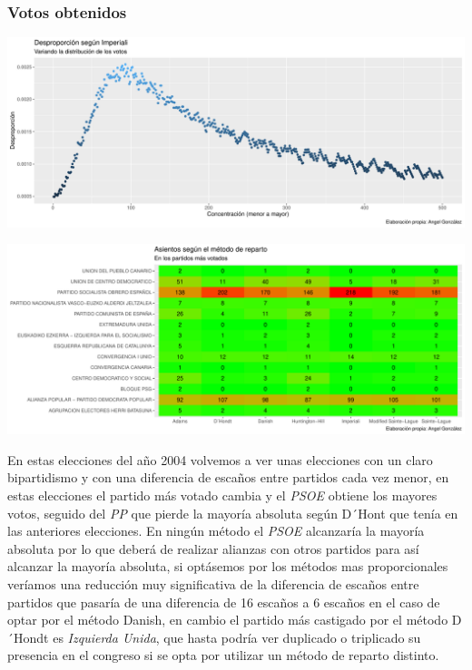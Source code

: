 \documentclass[12pt,a4paper,]{book}
\numberwithin{dummy}{section}
\theoremstyle{ocrenumbox}
\theoremstyle{blacknumex}
\theoremstyle{blacknumbox}
\theoremstyle{ocrenum}
\theoremstyle{ocrenum}
\begin{document}
\hypertarget{votos-obtenidos-8}{%
\subsubsection{Votos obtenidos}\label{votos-obtenidos-8}}

\begin{center}\includegraphics[width=1\linewidth]{figurasR/unnamed-chunk-29-1} \end{center}

\begin{center}\includegraphics[width=1\linewidth]{figurasR/unnamed-chunk-29-2} \end{center}

En estas elecciones del año 2004 volvemos a ver unas elecciones con un
claro bipartidismo y con una diferencia de escaños entre partidos cada
vez menor, en estas elecciones el partido más votado cambia y el
\emph{PSOE} obtiene los mayores votos, seguido del \emph{PP} que pierde
la mayoría absoluta según D´Hont que tenía en las anteriores elecciones.
En ningún método el \emph{PSOE} alcanzaría la mayoría absoluta por lo
que deberá de realizar alianzas con otros partidos para así alcanzar la
mayoría absoluta, si optásemos por los métodos mas proporcionales
veríamos una reducción muy significativa de la diferencia de escaños
entre partidos que pasaría de una diferencia de 16 escaños a 6 escaños
en el caso de optar por el método Danish, en cambio el partido más
castigado por el método D´Hondt es \emph{Izquierda Unida}, que hasta
podría ver duplicado o triplicado su presencia en el congreso si se opta
por utilizar un método de reparto distinto.
\end{document}
